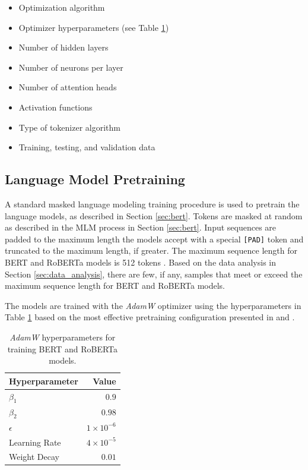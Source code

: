 \documentclass[12pt]{article}
\begin{document}
\begin{itemize}
    \item Optimization algorithm
    \item Optimizer hyperparameters (see Table \ref{tab:optim_params})
    \item Number of hidden layers
    \item Number of neurons per layer
    \item Number of attention heads
    \item Activation functions
    \item Type of tokenizer algorithm
    \item Training, testing, and validation data
\end{itemize}

\subsection{Language Model Pretraining}\label{sec:lm_pretraining}
A standard masked language modeling training procedure is used to pretrain the language models, as described in Section \ref{sec:bert}. Tokens are masked at random as described in the MLM process in Section \ref{sec:bert}. Input sequences are padded to the maximum length the models accept with a special \lstinline|[PAD]| token and truncated to the maximum length, if greater. The maximum sequence length for BERT and RoBERTa models is 512 tokens \cite{devlin_bert_2019,liu_roberta_2019}. Based on the data analysis in Section \ref{sec:data_analysis}, there are few, if any, samples that meet or exceed the maximum sequence length for BERT and RoBERTa models.

The models are trained with the \textit{AdamW} optimizer \cite{loshchilov_decoupled_2019} using the hyperparameters in Table \ref{tab:optim_params}
based on the most effective pretraining configuration presented in \cite{devlin_bert_2019} and \cite{liu_roberta_2019}.

\begin{table}[!t]
    \centering
    \begin{tabular}{l r}
        \toprule
        Hyperparameter & Value              \\
        \midrule
        $\beta_1$      & $0.9$              \\
        $\beta_2$      & $0.98$             \\
        $\epsilon$     & $1 \times 10^{-6}$ \\
        Learning Rate  & $4 \times 10^{-5}$ \\
        Weight Decay   & $0.01$             \\
        \bottomrule
    \end{tabular}
    \caption{\textit{AdamW} hyperparameters for training BERT and RoBERTa models.}
    \label{tab:optim_params}
\end{table}
\end{document}
